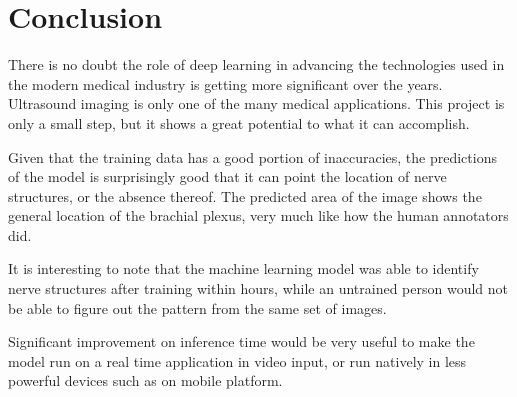 \section{Conclusion}

There is no doubt the role of deep learning in advancing the technologies used in the modern medical industry is getting more significant over the years. Ultrasound imaging is only one of the many medical applications. This project is only a small step, but it shows a great potential to what it can accomplish.

Given that the training data has a good portion of inaccuracies, the predictions of the model is surprisingly good that it can point the location of nerve structures, or the absence thereof. The predicted area of the image shows the general location of the brachial plexus, very much like how the human annotators did.

It is interesting to note that the machine learning model was able to identify nerve structures after training within hours, while an untrained person would not be able to figure out the pattern from the same set of images.

Significant improvement on inference time would be very useful to make the model run on a real time application in video input, or run natively in less powerful devices such as on mobile platform.